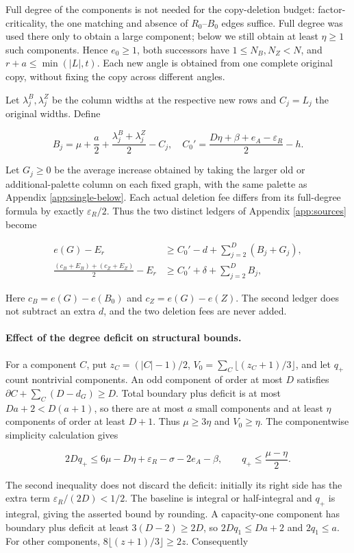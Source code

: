 \documentclass[11pt,a4paper]{article}
\theoremstyle{definition}
\begin{document}
Full degree of the components is not needed for the copy-deletion budget: factor-criticality, the one matching and absence of $R_0$--$B_0$ edges suffice. Full degree was used there only to obtain a large component; below we still obtain at least $\eta\ge1$ such components. Hence $e_0\ge1$, both successors have $1\le N_B,N_Z<N$, and $r+a\le\min(|L|,t)$. Each new angle is obtained from one complete original copy, without fixing the copy across different angles.

Let $\lambda_j^B,\lambda_j^Z$ be the column widths at the respective new rows and $C_j=L_j$ the original widths. Define

\[
 B_j=\mu+\frac a2+\frac{\lambda_j^B+\lambda_j^Z}{2}-C_j,
 \quad C_0'=\frac{D\eta+\beta+e_A-\varepsilon_R}{2}-h.
\]

Let $G_j\ge0$ be the average increase obtained by taking the larger old or additional-palette column on each fixed graph, with the same palette as Appendix \ref{app:single-below}. Each actual deletion fee differs from its full-degree formula by exactly $\varepsilon_R/2$. Thus the two distinct ledgers of Appendix \ref{app:sources} become

\begin{align}
 e(G)-E_r&\ge C_0'-d+\sum_{j=2}^D(B_j+G_j),\label{eq:D10-ledger-potential}\\
 \frac{(c_B+E_B)+(c_Z+E_Z)}2-E_r
 &\ge C_0'+\delta+\sum_{j=2}^D B_j,\label{eq:D10-ledger-area}
\end{align}

Here $c_B=e(G)-e(B_0)$ and $c_Z=e(G)-e(Z)$. The second ledger does not subtract an extra $d$, and the two deletion fees are never added.

\paragraph{Effect of the degree deficit on structural bounds.}
For a component $C$, put $z_C=(|C|-1)/2$, $V_0=\sum_C\lfloor(z_C+1)/3\rfloor$, and let $q_+$ count nontrivial components. An odd component of order at most $D$ satisfies
$\partial C+\sum_C(D-d_G)\ge D$. Total boundary plus deficit is at most $Da+2<D(a+1)$, so there are at most $a$ small components and at least $\eta$ components of order at least $D+1$. Thus $\mu\ge3\eta$ and $V_0\ge\eta$. The componentwise simplicity calculation gives

\[
 2Dq_+\le6\mu-D\eta+\varepsilon_R-\sigma-2e_A-\beta,
 \qquad q_+\le\frac{\mu-\eta}{2}.
\]

The second inequality does not discard the deficit: initially its right side has the extra term $\varepsilon_R/(2D)<1/2$. The baseline is integral or half-integral and $q_+$ is integral, giving the asserted bound by rounding. A capacity-one component has boundary plus deficit at least $3(D-2)\ge2D$, so $2Dq_1\le Da+2$ and $2q_1\le a$. For other components, $8\lfloor(z+1)/3\rfloor\ge2z$. Consequently
\end{document}
